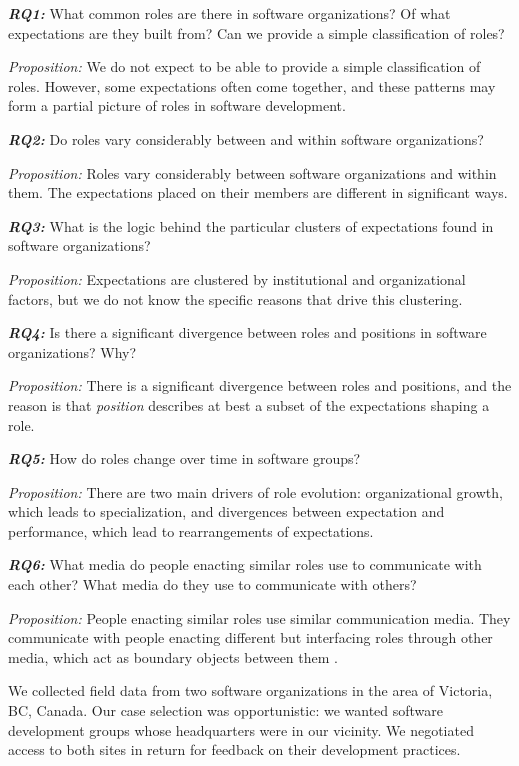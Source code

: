 \documentclass[10pt, conference, compsocconf]{IEEEtran}
\begin{document}
\textbf{\emph{RQ1:}} What common roles are there in software organizations? Of what expectations are they built from? Can we provide a simple classification of roles?

\emph{Proposition:} We do not expect to be able to provide a simple classification of roles. However, some expectations often come together, and these patterns may form a partial picture of roles in software development.

\textbf{\emph{RQ2:}} Do roles vary considerably between and within software organizations?

\emph{Proposition:} Roles vary considerably between software organizations and within them. The expectations placed on their members are different in significant ways.

\textbf{\emph{RQ3:}} What is the logic behind the particular clusters of expectations found in software organizations?

\emph{Proposition:} Expectations are clustered by institutional and organizational factors, but we do not know the specific reasons that drive this clustering.

\textbf{\emph{RQ4:}} Is there a significant divergence between roles and positions in software organizations? Why?

\emph{Proposition:} There is a significant divergence between roles and positions, and the reason is that \emph{position} describes at best a subset of the expectations shaping a role.

\textbf{\emph{RQ5:}} How do roles change over time in software groups?

\emph{Proposition:} There are two main drivers of role evolution: organizational growth, which leads to specialization, and divergences between expectation and performance, which lead to rearrangements of expectations.

\textbf{\emph{RQ6:}} What media do people enacting similar roles use to communicate with each other? What media do they use to communicate with others?

\emph{Proposition:} People enacting similar roles use similar communication media. They communicate with people enacting different but interfacing roles through other media, which act as boundary objects between them \cite{Bowker1999}.

We collected field data from two software organizations in the area of Victoria, BC, Canada. Our case selection was opportunistic: we wanted software development groups whose headquarters were in our vicinity. We negotiated access to both sites in return for feedback on their development practices.
\end{document}
